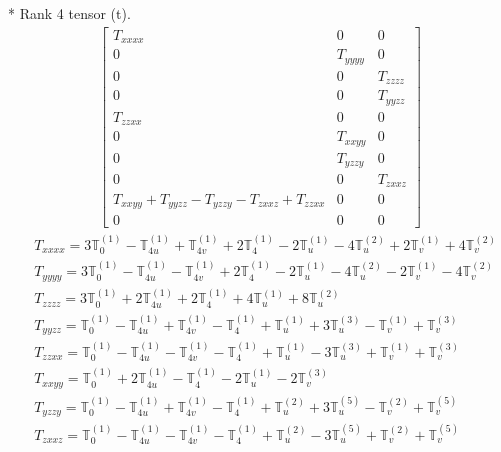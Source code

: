 \documentclass[fleqn,8pt,landscape]{jsarticle}
\begin{document}
* Rank 4 tensor (t).
\begin{align*}
\begin{bmatrix} T_{xxxx} & 0 & 0 \\ 0 & T_{yyyy} & 0 \\ 0 & 0 & T_{zzzz} \\ 0 & 0 & T_{yyzz} \\ T_{zzxx} & 0 & 0 \\ 0 & T_{xxyy} & 0 \\ 0 & T_{yzzy} & 0 \\ 0 & 0 & T_{zxxz} \\ T_{xxyy} + T_{yyzz} - T_{yzzy} - T_{zxxz} + T_{zzxx} & 0 & 0 \\ 0 & 0 & 0 \end{bmatrix}
\end{align*}
\begin{align*}
& T_{xxxx} = 3 \mathbb{T}_{0}^{(1)} - \mathbb{T}_{4u}^{(1)} + \mathbb{T}_{4v}^{(1)} + 2 \mathbb{T}_{4}^{(1)} - 2 \mathbb{T}_{u}^{(1)} - 4 \mathbb{T}_{u}^{(2)} + 2 \mathbb{T}_{v}^{(1)} + 4 \mathbb{T}_{v}^{(2)} \\
& T_{yyyy} = 3 \mathbb{T}_{0}^{(1)} - \mathbb{T}_{4u}^{(1)} - \mathbb{T}_{4v}^{(1)} + 2 \mathbb{T}_{4}^{(1)} - 2 \mathbb{T}_{u}^{(1)} - 4 \mathbb{T}_{u}^{(2)} - 2 \mathbb{T}_{v}^{(1)} - 4 \mathbb{T}_{v}^{(2)} \\
& T_{zzzz} = 3 \mathbb{T}_{0}^{(1)} + 2 \mathbb{T}_{4u}^{(1)} + 2 \mathbb{T}_{4}^{(1)} + 4 \mathbb{T}_{u}^{(1)} + 8 \mathbb{T}_{u}^{(2)} \\
& T_{yyzz} = \mathbb{T}_{0}^{(1)} - \mathbb{T}_{4u}^{(1)} + \mathbb{T}_{4v}^{(1)} - \mathbb{T}_{4}^{(1)} + \mathbb{T}_{u}^{(1)} + 3 \mathbb{T}_{u}^{(3)} - \mathbb{T}_{v}^{(1)} + \mathbb{T}_{v}^{(3)} \\
& T_{zzxx} = \mathbb{T}_{0}^{(1)} - \mathbb{T}_{4u}^{(1)} - \mathbb{T}_{4v}^{(1)} - \mathbb{T}_{4}^{(1)} + \mathbb{T}_{u}^{(1)} - 3 \mathbb{T}_{u}^{(3)} + \mathbb{T}_{v}^{(1)} + \mathbb{T}_{v}^{(3)} \\
& T_{xxyy} = \mathbb{T}_{0}^{(1)} + 2 \mathbb{T}_{4u}^{(1)} - \mathbb{T}_{4}^{(1)} - 2 \mathbb{T}_{u}^{(1)} - 2 \mathbb{T}_{v}^{(3)} \\
& T_{yzzy} = \mathbb{T}_{0}^{(1)} - \mathbb{T}_{4u}^{(1)} + \mathbb{T}_{4v}^{(1)} - \mathbb{T}_{4}^{(1)} + \mathbb{T}_{u}^{(2)} + 3 \mathbb{T}_{u}^{(5)} - \mathbb{T}_{v}^{(2)} + \mathbb{T}_{v}^{(5)} \\
& T_{zxxz} = \mathbb{T}_{0}^{(1)} - \mathbb{T}_{4u}^{(1)} - \mathbb{T}_{4v}^{(1)} - \mathbb{T}_{4}^{(1)} + \mathbb{T}_{u}^{(2)} - 3 \mathbb{T}_{u}^{(5)} + \mathbb{T}_{v}^{(2)} + \mathbb{T}_{v}^{(5)}
\end{align*}
\end{document}
